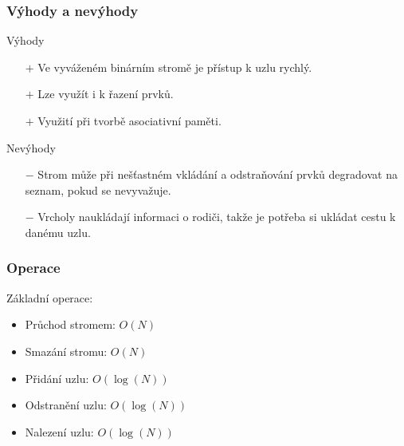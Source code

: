 \documentclass[10pt,xcolor=pdflatex,hyperref={unicode}]{beamer}
\begin{document}
\begin{frame}\frametitle{Výhody a nevýhody}

    \begin{block}{Výhody}
        \begin{itemize}
            \item[$+$] Ve vyváženém binárním stromě je přístup k uzlu rychlý.
            \item[$+$] Lze využít i k řazení prvků.
            \item[$+$] Využití při tvorbě asociativní paměti.
        \end{itemize}
    \end{block}
    
    \begin{alertblock}{Nevýhody}
        \begin{itemize}
            \item[$-$] Strom může při nešťastném vkládání a odstraňování prvků degradovat na seznam, pokud se nevyvažuje.
            \item[$-$] Vrcholy naukládají informaci o rodiči, takže je potřeba si ukládat cestu k danému uzlu.
        \end{itemize}
    \end{alertblock}
    
\end{frame}

\begin{frame}\frametitle{Operace}

    Základní operace:
    \begin{itemize}
        \item Průchod stromem: $O(N)$
        \item Smazání stromu: $O(N)$
        \item Přidání uzlu: $O(\log(N))$
        \item Odstranění uzlu: $O(\log(N))$
        \item Nalezení uzlu: $O(\log(N))$
    \end{itemize}
    
\end{frame}
\end{document}
